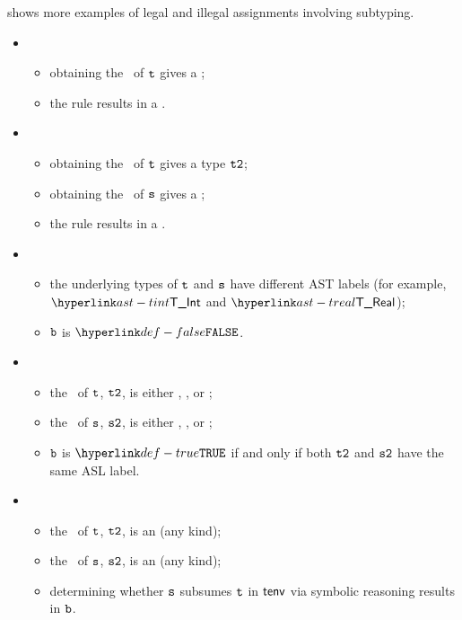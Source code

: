 shows more examples of legal and illegal assignments involving
subtyping.

\ProseParagraph
\OneApplies
\begin{itemize}
\item {}
  \begin{itemize}
  \item obtaining the \underlyingtype\ of $\texttt{t}$ gives a \typingerrorterm{};
  \item the rule results in a \typingerrorterm{}.
  \end{itemize}

\item {}
  \begin{itemize}
    \item obtaining the \underlyingtype\ of $\texttt{t}$ gives a type $\texttt{t2}$;
    \item obtaining the \underlyingtype\ of $\texttt{s}$ gives a \typingerrorterm{};
    \item the rule results in a \typingerrorterm{}.
    \end{itemize}

\item {}
  \begin{itemize}
  \item the underlying types of $\texttt{t}$ and $\texttt{s}$ have different AST labels
  (for example, $\TInt$ and $\TReal$);
  \item $\texttt{b}$ is $\False$.
  \end{itemize}

\item {}
  \begin{itemize}
  \item the \underlyingtype\ of $\texttt{t}$, $\texttt{t2}$, is either \realtypeterm{}, \stringtypeterm{}, or \booleantypeterm{};
  \item the \underlyingtype\ of $\texttt{s}$, $\texttt{s2}$, is either \realtypeterm{}, \stringtypeterm{}, or \booleantypeterm{};
  \item $\texttt{b}$ is $\True$ if and only if both $\texttt{t2}$ and $\texttt{s2}$ have the same ASL label.
  \end{itemize}

\item {}
  \begin{itemize}
  \item the \underlyingtype\ of $\texttt{t}$, $\texttt{t2}$, is an \integertypeterm{} (any kind);
  \item the \underlyingtype\ of $\texttt{s}$, $\texttt{s2}$, is an \integertypeterm{} (any kind);
  \item determining whether $\texttt{s}$ subsumes $\texttt{t}$ in $\textsf{tenv}$ via symbolic reasoning results in $\texttt{b}$.
  \end{itemize}


\end{itemize}

